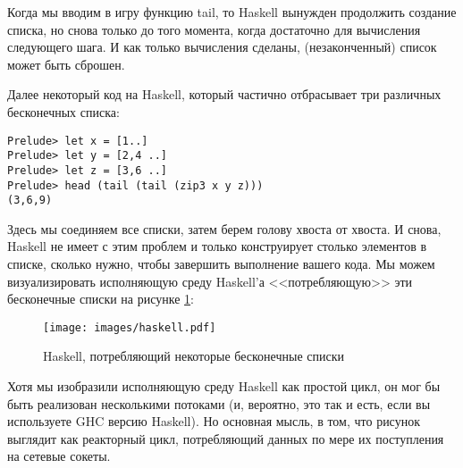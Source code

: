 Когда мы вводим в игру функцию tail, то Haskell вынужден 
продолжить создание списка, но снова только до того момента, когда 
достаточно для вычисления следующего шага. И как только вычисления 
сделаны, (незаконченный) список может быть сброшен.  


Далее некоторый код на Haskell, который частично отбрасывает три 
различных бесконечных списка: 

 \begin{verbatim}
Prelude> let x = [1..]
Prelude> let y = [2,4 ..]
Prelude> let z = [3,6 ..]
Prelude> head (tail (tail (zip3 x y z)))
(3,6,9)
\end{verbatim} 


Здесь мы соединяем все списки, затем берем голову хвоста от хвоста. 
И снова, Haskell не имеет с этим проблем и только конструирует 
столько элементов в списке, сколько нужно, чтобы 
завершить выполнение вашего кода. Мы можем визуализировать 
исполняющую среду Haskell'а <<потребляющую>> эти бесконечные списки на рисунке \ref{fig:haskell}:  

\begin{figure}[h]
\begin{center}
    \texttt{[image: images/haskell.pdf]}
    \caption{Haskell, потребляющий некоторые бесконечные списки\label{fig:haskell}}
\end{center}
\end{figure}

Хотя мы изобразили исполняющую среду Haskell как простой цикл, 
он мог бы быть реализован несколькими потоками (и, вероятно, это 
так и есть, если вы используете GHC версию Haskell). Но основная 
мысль, в том, что рисунок выглядит как реакторный цикл, 
потребляющий данных по мере их поступления на сетевые сокеты.   


